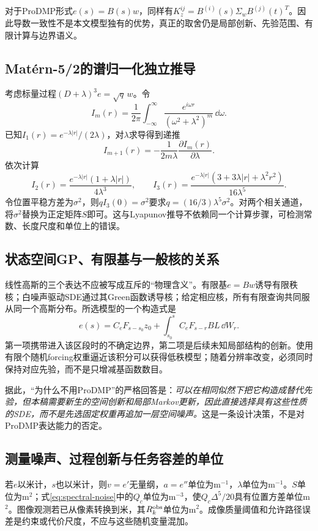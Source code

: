 \documentclass[UTF8,11pt,a4paper,fontset=fandol]{ctexart}
\numberwithin{equation}{section}
\theoremstyle{plain}
\theoremstyle{definition}
\theoremstyle{remark}
\begin{document}
对于ProDMP形式$e(s)=B(s)w$，同样有$K_z^{ij}=B^{(i)}(s)\Sigma_w B^{(j)}(t)^T$。因此导数一致性不是本文模型独有的优势，真正的取舍仍是局部创新、先验范围、有限计算与边界语义。

\subsection{Mat\'ern-5/2的谱归一化独立推导}
考虑标量过程$(D+\lambda)^3e=\sqrt q\,w$。令
\begin{equation}
 I_m(r)=\frac1{2\pi}\int_{-\infty}^{\infty}
 \frac{e^{i\omega r}}{(\omega^2+\lambda^2)^m}\,\dd\omega.
\end{equation}
已知$I_1(r)=e^{-\lambda|r|}/(2\lambda)$，对$\lambda$求导得到递推
\begin{equation}
 I_{m+1}(r)=-\frac1{2m\lambda}\frac{\partial I_m(r)}{\partial\lambda}.
\end{equation}
依次计算
\begin{equation}
 I_2(r)=\frac{e^{-\lambda|r|}(1+\lambda|r|)}{4\lambda^3},\qquad
 I_3(r)=\frac{e^{-\lambda|r|}(3+3\lambda|r|+\lambda^2r^2)}{16\lambda^5}.
\end{equation}
令位置平稳方差为$\sigma^2$，则$qI_3(0)=\sigma^2$要求$q=(16/3)\lambda^5\sigma^2$。对两个相关通道，将$\sigma^2$替换为正定矩阵$S$即可。这与Lyapunov推导不依赖同一个计算步骤，可检测常数、长度尺度和单位上的错误。

\subsection{状态空间GP、有限基与一般核的关系}
线性高斯的三个表达不应被写成互斥的“物理含义”。有限基$e=Bw$诱导有限秩核；白噪声驱动SDE通过其Green函数诱导核；给定相应核，所有有限查询共同服从同一个高斯分布。所选模型的一个构造式是
\begin{equation}
 e(s)=C_eF_{s-s_0}z_0+
 \int_{s_0}^{s}C_eF_{s-r}BL\,\dd W_r.
 \label{eq:green-model}
\end{equation}
第一项携带进入该区段时的不确定边界，第二项是后续未知局部结构的创新。使用有限个随机forcing权重逼近该积分可以获得低秩模型；随着分辨率改变，必须同时保持对应先验，而不是只增减基函数数目。

据此，“为什么不用ProDMP”的严格回答是：\emph{可以在相同似然下把它构造成替代先验，但本稿需要新生的空间创新和局部Markov更新，因此直接选择具有这些性质的SDE，而不是先选固定权重再追加一层空间噪声。}这是一条设计决策，不是对ProDMP表达能力的否定。

\subsection{测量噪声、过程创新与任务容差的单位}
若$e$以米计，$s$也以米计，则$v=e'$无量纲，$a=e''$单位为m$^{-1}$，$\lambda$单位为m$^{-1}$。$S$单位为m$^2$；式\eqref{eq:spectral-noise}中的$Q_c$单位为m$^{-3}$，使$Q_c\Delta^5/20$具有位置方差单位m$^2$。图像观测若已从像素转换到米，其$R_k^{\rm obs}$单位为m$^2$。成像质量阈值和允许路径误差是约束或代价尺度，不应与这些随机变量混加。
\end{document}
